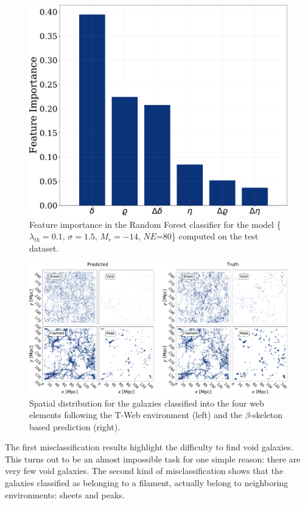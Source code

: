 \documentclass[usenatbib]{mnras}
\begin{document}
\begin{figure}
    \includegraphics[scale=0.29]{Figs/p_features_importance_test.pdf}  
    \caption{
      Feature importance in the Random Forest classifier for the model
      \{$\lambda_{th}=0.1$, $\sigma=1.5$, $M_r=-14$,
      $NE$=80\} computed on the test dataset.}
    \label{fig:feature_importance}
\end{figure}

\begin{figure}
  \centering 
    \includegraphics[scale=0.28]{Figs/p_environment_predicted.pdf}
    \caption{Spatial distribution for the galaxies classified into the
      four web elements following the T-Web environment (left) and 
      the $\beta$-skeleton based prediction (right).} 
    \label{fig:prediction}
\end{figure}

The first misclassification results highlight the difficulty to find void galaxies.
This turns out to be an almost impossible task for one simple reason:
there are very few void galaxies.
The second kind of misclassification shows that the galaxies
classified as belonging to a filament, actually belong to neighboring
environments: sheets and peaks.
\end{document}

